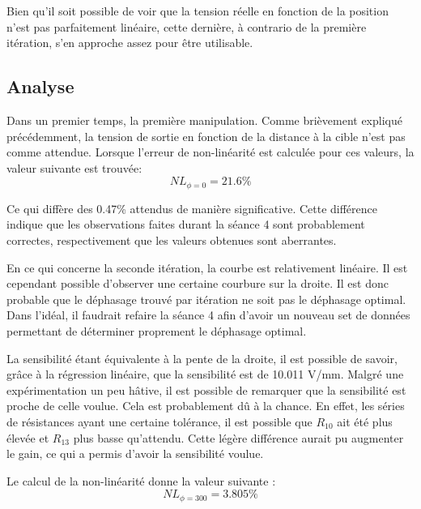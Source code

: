 Bien qu'il soit possible de voir que la tension réelle en fonction de la position n'est pas 
parfaitement linéaire, cette dernière, à contrario de la première itération, s'en approche assez
pour être utilisable.

\subsection{Analyse}
Dans un premier temps, la première manipulation. Comme brièvement expliqué précédemment, la tension
de sortie en fonction de la distance à la cible n'est pas comme attendue. Lorsque l'erreur de
non-linéarité est calculée pour ces valeurs, la valeur suivante est trouvée:
\begin{equation*}
    NL_{\phi=0} = 21.6\% 
\end{equation*}

Ce qui diffère des 0.47\% attendus de manière significative. Cette différence indique que les 
observations faites durant la séance 4 sont probablement correctes, respectivement que les valeurs
obtenues sont aberrantes.
\newpage

En ce qui concerne la seconde itération, la courbe est relativement linéaire. Il est cependant
possible d'observer une certaine courbure sur la droite. Il est donc probable que le déphasage
trouvé par itération ne soit pas le déphasage optimal. Dans l'idéal, il faudrait refaire la
séance 4 afin d'avoir un nouveau set de données permettant de déterminer proprement le déphasage
optimal.
\vspace{0.2cm}

La sensibilité étant
équivalente à la pente de la droite, il est possible de savoir, grâce à la régression linéaire,
que la sensibilité est de 10.011 V/mm. Malgré une expérimentation un peu hâtive, il est possible
de remarquer que la sensibilité est proche de celle voulue. Cela est probablement dû à la chance.
En effet, les séries de résistances ayant une certaine tolérance, il est possible que $R_{10}$ ait
été plus élevée et $R_{13}$ plus basse qu'attendu. Cette légère différence aurait pu augmenter le
gain, ce qui a permis d'avoir la sensibilité voulue.
\vspace{0.2cm}

Le calcul de la non-linéarité donne la valeur suivante :
\begin{equation*}
    NL_{\phi =300} = 3.805\% 
\end{equation*}

